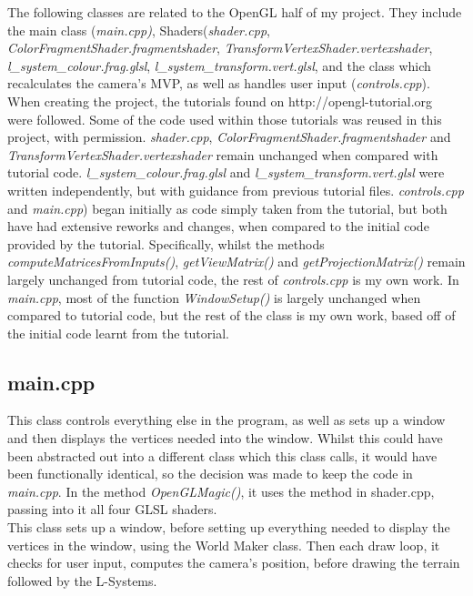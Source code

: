 \documentclass[a4paper,10pt]{report}
\begin{document}
The following classes are related to the OpenGL half of my project. They include the main class (\textit{main.cpp)}, Shaders(\textit{shader.cpp}, \textit{ColorFragmentShader.fragmentshader}, \textit{TransformVertexShader.vertexshader}, \textit{l\_system\_colour.frag.glsl}, \textit{l\_system\_transform.vert.glsl}, and the class which recalculates the camera's MVP, as well as handles user input (\textit{controls.cpp}). When creating the project, the tutorials found on http://opengl-tutorial.org~\cite{opengl_tutorial} were followed. Some of the code used within those tutorials was reused in this project, with permission. \textit{shader.cpp}, \textit{ColorFragmentShader.fragmentshader} and \textit{TransformVertexShader.vertexshader} remain unchanged when compared with tutorial code. \textit{l\_system\_colour.frag.glsl} and \textit{l\_system\_transform.vert.glsl} were written independently, but with guidance from previous tutorial files. \textit{controls.cpp} and \textit{main.cpp}) began initially as code simply taken from the tutorial, but both have had extensive reworks and changes, when compared to the initial code provided by the tutorial. Specifically, whilst the methods \textit{computeMatricesFromInputs()}, \textit{getViewMatrix()} and \textit{getProjectionMatrix()} remain largely unchanged from tutorial code, the rest of \textit{controls.cpp} is my own work. In \textit{main.cpp}, most of the function \textit{WindowSetup()} is largely unchanged when compared to tutorial code, but the rest of the class is my own work, based off of the initial code learnt from the tutorial. \\

\subsection{main.cpp} 

This class controls everything else in the program, as well as sets up a window and then displays the vertices needed into the window. Whilst this could have been abstracted out into a different class which this class calls, it would have been functionally identical, so the decision was made to keep the code in \textit{main.cpp}. In the method \textit{OpenGLMagic()}, it uses the method in shader.cpp, passing into it all four GLSL shaders. \\

This class sets up a window, before setting up everything needed to display the vertices in the window, using the World Maker class. Then each draw loop, it checks for user input, computes the camera's position, before drawing the terrain followed by the L-Systems.
\end{document}
